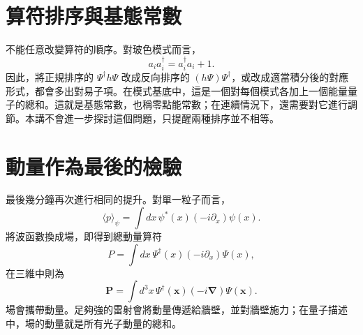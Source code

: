\begin{classroomqa}
\end{classroomqa}

\section{算符排序與基態常數}

不能任意改變算符的順序。對玻色模式而言，
\begin{equation}
a_i a_i^\dagger=a_i^\dagger a_i+1.
\end{equation}
因此，將正規排序的 \(\Psi^\dagger h\Psi\) 改成反向排序的 \((h\Psi)\Psi^\dagger\)，或改成適當積分後的對應形式，都會多出對易子項。在模式基底中，這是一個對每個模式各加上一個能量量子的總和。這就是基態常數，也稱零點能常數；在連續情況下，還需要對它進行調節。本講不會進一步探討這個問題，只提醒兩種排序並不相等。

\begin{classroomqa}
\end{classroomqa}

\section{動量作為最後的檢驗}

最後幾分鐘再次進行相同的提升。對單一粒子而言，
\begin{equation}
\langle p\rangle_\psi
=\int dx\,\psi^*(x)\left(-i\partial_x\right)\psi(x).
\label{eq:l07-one-particle-momentum}
\end{equation}
將波函數換成場，即得到總動量算符
\begin{equation}
P=\int dx\,\Psi^\dagger(x)\left(-i\partial_x\right)\Psi(x),
\label{eq:l07-field-momentum}
\end{equation}
在三維中則為
\begin{equation}
\mathbf P=\int d^3x\,\Psi^\dagger(\mathbf x)
\left(-i\boldsymbol\nabla\right)\Psi(\mathbf x).
\end{equation}
場會攜帶動量。足夠強的雷射會將動量傳遞給牆壁，並對牆壁施力；在量子描述中，場的動量就是所有光子動量的總和。

